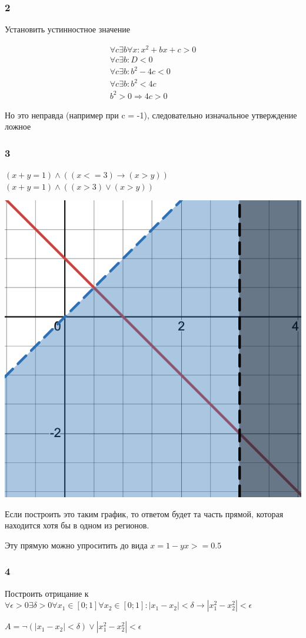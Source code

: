 \documentclass[letterpaper]{article}
\begin{document}
\subsubsection{2}
\label{sec:orgb4eaf1a}
Установить устинностное значение

\begin{equation}
\begin{aligned}
\forall c \exists b \forall x: x^2 + bx + c > 0 \\
\forall c \exists b: D < 0 \\
\forall c \exists b: b^2 - 4c < 0 \\
\forall c \exists b: b^2 < 4c \\
b^2 > 0 \Rightarrow 4c > 0
\end{aligned}
\end{equation}

Но это неправда (например при c = -1), следовательно изначальное утверждение ложное
\subsubsection{3}
\label{sec:orgff8c062}
\((x + y = 1) \land ((x <= 3) \rightarrow (x > y))\)
\((x + y = 1) \land ((x > 3) \lor (x > y))\)

\begin{center}
\includegraphics[width=.9\linewidth]{./src/quantifier_graph.png}
\end{center}

Если построить это таким график, то ответом будет та часть прямой, которая находится хотя бы в одном из регионов.

Эту прямую можно упроситить до вида  \(x = 1 - y {x >= 0.5}\)
\subsubsection{4}
\label{sec:org7799f6a}
Построить отрицание к
\(\forall \epsilon > 0 \exists \delta > 0 \forall x_1 \in [0;1] \forall x_2 \in [0;1]: |x_1 - x_2| < \delta \rightarrow |x_1^2 - x_2^2| < \epsilon\)

\(A = \neg{(|x_1 - x_2| < \delta)} \lor |x_1^2 - x_2^2| < \epsilon\)
\end{document}

